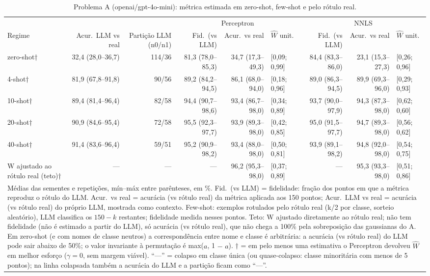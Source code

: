 \begin{table}[htbp]
\centering
\small
\caption{Problema A (openai/gpt-4o-mini): métrica estimada em zero-shot, few-shot e pelo rótulo real.}
\label{tab:T1_A_gpt4mini}
\begin{tabular}{lrrrrlrrl}
\toprule
 &  &  & \multicolumn{3}{c}{Perceptron} & \multicolumn{3}{c}{NNLS} \\ \cmidrule(lr){4-6} \cmidrule(lr){7-9}
Regime & Acur.\ LLM vs real & Partição LLM (n0/n1) & Fid.\ (vs LLM) & Acur.\ vs real & $\hat{W}$ unit. & Fid.\ (vs LLM) & Acur.\ vs real & $\hat{W}$ unit. \\
\midrule
zero-shot† & 32,4 (28,0–36,7) & 114/36 & 81,3 (78,0–85,3) & 34,7 (17,3–49,3) & [0,09; 0,99] & 84,4 (83,3–86,0) & 23,1 (15,3–27,3) & [0,26; 0,96] \\
4-shot† & 81,9 (67,8–91,8) & 90/56 & 89,2 (84,2–94,5) & 86,1 (68,0–94,0) & [0,18; 0,96] & 89,0 (86,3–94,5) & 89,9 (69,3–96,0) & [0,29; 0,93] \\
10-shot† & 89,4 (81,4–96,4) & 82/58 & 94,4 (90,7–98,6) & 93,4 (86,7–98,0) & [0,34; 0,89] & 93,7 (90,0–97,9) & 94,3 (87,3–98,0) & [0,62; 0,60] \\
20-shot† & 90,9 (84,6–95,4) & 72/58 & 95,5 (92,3–97,7) & 93,9 (89,3–98,0) & [0,42; 0,85] & 95,0 (91,5–97,7) & 94,7 (89,3–98,0) & [0,56; 0,62] \\
40-shot† & 91,4 (83,6–96,4) & 59/51 & 95,2 (90,9–98,2) & 93,4 (88,0–98,0) & [0,50; 0,81] & 93,9 (89,1–98,2) & 94,8 (92,0–98,0) & [0,54; 0,75] \\
\midrule
W ajustado ao rótulo real (teto)† & — & — & — & 96,2 (95,3–98,0) & [0,37; 0,89] & — & 95,3 (93,3–98,0) & [0,51; 0,86] \\
\bottomrule
\multicolumn{9}{p{0.95\linewidth}}{\footnotesize Médias das sementes e repetições, mín–máx entre parênteses, em \%. Fid.\ (vs LLM) = fidelidade: fração dos pontos em que a métrica reproduz o rótulo do LLM. Acur.\ vs real = acurácia (vs rótulo real) da métrica aplicada aos 150 pontos; Acur.\ LLM vs real = acurácia (vs rótulo real) do próprio LLM, mostrada como contexto. Few-shot: exemplos rotulados pelo rótulo real (k/2 por classe, sorteio aleatório), LLM classifica os $150-k$ restantes; fidelidade medida nesses pontos. Teto: W ajustado diretamente ao rótulo real; não tem fidelidade (não é estimado a partir do LLM), só acurácia (vs rótulo real), que não chega a 100\% pela sobreposição das gaussianas do A. Em zero-shot (e com nomes de classe neutros) a correspondência entre nome e classe é arbitrária: a acurácia (vs rótulo real) do LLM pode sair abaixo de 50\%; o valor invariante à permutação é max($a$, 1 $-$ $a$). † = em pelo menos uma estimativa o Perceptron devolveu $\hat{W}$ em melhor esforço ($\gamma = 0$, sem margem viável). ``—'' = colapso em classe única (ou quase-colapso: classe minoritária com menos de 5 pontos); na linha colapsada também a acurácia do LLM e a partição ficam como ``—''.} \\
\end{tabular}
\end{table}
